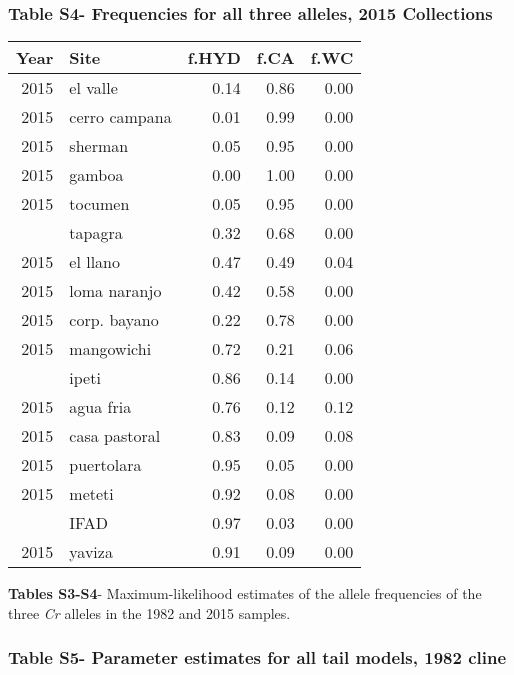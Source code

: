 \documentclass[]{article}
\begin{document}
\subsubsection{Table S4- Frequencies for all three alleles, 2015
Collections}\label{table-s4--frequencies-for-all-three-alleles-2015-collections}

\begin{table}[H]
\centering
\begin{tabular}{rlrrr}
\toprule
Year & Site & f.HYD & f.CA & f.WC\\
\midrule
2015 & el valle & 0.14 & 0.86 & 0.00\\
2015 & cerro campana & 0.01 & 0.99 & 0.00\\
2015 & sherman & 0.05 & 0.95 & 0.00\\
2015 & gamboa & 0.00 & 1.00 & 0.00\\
2015 & tocumen & 0.05 & 0.95 & 0.00\\
\addlinespace
2015 & tapagra & 0.32 & 0.68 & 0.00\\
2015 & el llano & 0.47 & 0.49 & 0.04\\
2015 & loma naranjo & 0.42 & 0.58 & 0.00\\
2015 & corp. bayano & 0.22 & 0.78 & 0.00\\
2015 & mangowichi & 0.72 & 0.21 & 0.06\\
\addlinespace
2015 & ipeti & 0.86 & 0.14 & 0.00\\
2015 & agua fria & 0.76 & 0.12 & 0.12\\
2015 & casa pastoral & 0.83 & 0.09 & 0.08\\
2015 & puertolara & 0.95 & 0.05 & 0.00\\
2015 & meteti & 0.92 & 0.08 & 0.00\\
\addlinespace
2015 & IFAD & 0.97 & 0.03 & 0.00\\
2015 & yaviza & 0.91 & 0.09 & 0.00\\
\bottomrule
\end{tabular}
\end{table}

\textbf{Tables S3-S4}- Maximum-likelihood estimates of the allele
frequencies of the three \textit{Cr} alleles in the 1982 and 2015
samples.

\pagebreak

\subsubsection{Table S5- Parameter estimates for all tail models, 1982
cline}\label{table-s5--parameter-estimates-for-all-tail-models-1982-cline}
\end{document}
